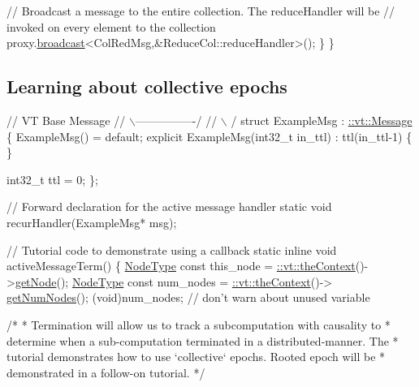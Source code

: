 \begin{DoxyCodeInclude}
    \textcolor{comment}{// Broadcast a message to the entire collection. The reduceHandler will be}
    \textcolor{comment}{// invoked on every element to the collection}
    proxy.\hyperlink{structvt_1_1objgroup_1_1proxy_1_1_proxy_a0b716ca776b1f06e0d7d45afbe9e5274}{broadcast}<ColRedMsg,&ReduceCol::reduceHandler>();
  \}
\}
\end{DoxyCodeInclude}
\hypertarget{tutorial-3a}{}\subsection{Learning about collective epochs}\label{tutorial-3a}

\begin{DoxyCodeInclude}
\textcolor{comment}{//              VT Base Message}
\textcolor{comment}{//             \(\backslash\)----------------/}
\textcolor{comment}{//              \(\backslash\)              /}
\textcolor{keyword}{struct }ExampleMsg : \hyperlink{structvt_1_1messaging_1_1_active_msg}{::vt::Message} \{
  ExampleMsg() = \textcolor{keywordflow}{default};
  \textcolor{keyword}{explicit} ExampleMsg(int32\_t in\_ttl) : ttl(in\_ttl-1) \{ \}

  int32\_t ttl = 0;
\};

\textcolor{comment}{// Forward declaration for the active message handler}
\textcolor{keyword}{static} \textcolor{keywordtype}{void} recurHandler(ExampleMsg* msg);

\textcolor{comment}{// Tutorial code to demonstrate using a callback}
\textcolor{keyword}{static} \textcolor{keyword}{inline} \textcolor{keywordtype}{void} activeMessageTerm() \{
  \hyperlink{namespacevt_a866da9d0efc19c0a1ce79e9e492f47e2}{NodeType} \textcolor{keyword}{const} this\_node = \hyperlink{namespacevt_a26551fe0e6e6a1371111df5b12c7e92c}{::vt::theContext}()->\hyperlink{structvt_1_1ctx_1_1_context_a0d52c263ce8516546a67443d9a86fa5f}{getNode}();
  \hyperlink{namespacevt_a866da9d0efc19c0a1ce79e9e492f47e2}{NodeType} \textcolor{keyword}{const} num\_nodes = \hyperlink{namespacevt_a26551fe0e6e6a1371111df5b12c7e92c}{::vt::theContext}()->
      \hyperlink{structvt_1_1ctx_1_1_context_a7f41071aadf6d5fa9e1b6c703c5ff19d}{getNumNodes}();
  (void)num\_nodes;  \textcolor{comment}{// don't warn about unused variable}

  \textcolor{comment}{/*}
\textcolor{comment}{   * Termination will allow us to track a subcomputation with causality to}
\textcolor{comment}{   * determine when a sub-computation terminated in a distributed-manner. The}
\textcolor{comment}{   * tutorial demonstrates how to use `collective` epochs. Rooted epoch will be}
\textcolor{comment}{   * demonstrated in a follow-on tutorial.}
\textcolor{comment}{   */}


\end{DoxyCodeInclude}
